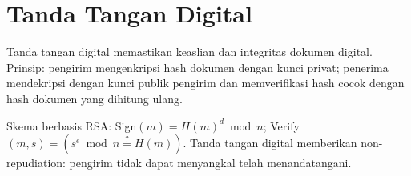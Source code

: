 \section{Tanda Tangan Digital}

Tanda tangan digital memastikan keaslian dan integritas dokumen digital. Prinsip: pengirim mengenkripsi hash dokumen dengan kunci privat; penerima mendekripsi dengan kunci publik pengirim dan memverifikasi hash cocok dengan hash dokumen yang dihitung ulang.

Skema berbasis RSA: Sign$(m) = H(m)^d \bmod n$; Verify$(m, s) = (s^e \bmod n \stackrel{?}{=} H(m))$. Tanda tangan digital memberikan non-repudiation: pengirim tidak dapat menyangkal telah menandatangani.

